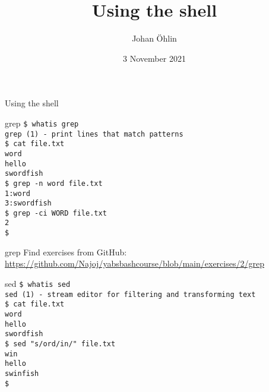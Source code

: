 \documentclass{beamer}
\title{Using the shell}
\date{3 November 2021}
\author{Johan Öhlin}
\institute{Yabs}
\let\tt\texttt
\begin{document}
\begin{frame}{Using the shell}
\maketitle
\end{frame}

\begin{frame}{grep}
        \tt{\$ whatis grep}\\
        \tt{grep (1)  - print lines that match patterns}\\
        \tt{\$ cat file.txt} \\
        \tt{word} \\
        \tt{hello} \\
        \tt{swordfish} \\
        \tt{\$ grep -n word     file.txt} \\
        \tt{1:word} \\
        \tt{3:swordfish} \\
        \tt{\$ grep -ci WORD    file.txt} \\
        \tt{2} \\
        \tt{\$ } \\
\end{frame}

\begin{frame}{grep}
        Find exercises from GitHub: \\
        \url{https://github.com/Najoj/yabsbashcourse/blob/main/exercises/2/grep}
\end{frame}

\begin{frame}{sed}
        \tt{\$ whatis sed}\\
        \tt{sed (1)   - stream editor for filtering and transforming text}\\
        \tt{\$ cat file.txt} \\
        \tt{word} \\
        \tt{hello} \\
        \tt{swordfish} \\
        \tt{\$ sed "s/ord/in/" file.txt} \\
        \tt{win} \\
        \tt{hello} \\
        \tt{swinfish} \\
        \tt{\$ } \\
\end{frame}
\end{document}
